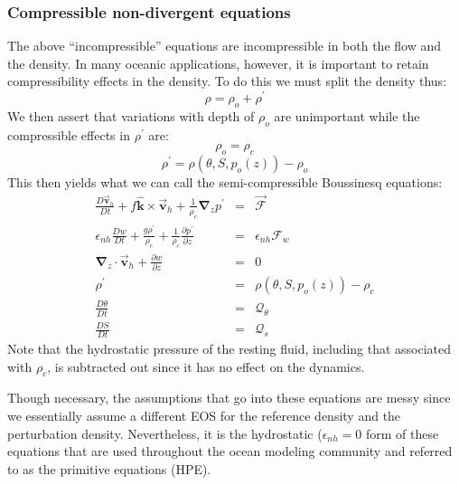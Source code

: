 \documentclass[12pt]{book}
\begin{document}
\subsubsection{Compressible non-divergent equations}

The above ``incompressible'' equations are incompressible in both the flow
and the density. In many oceanic applications, however, it is important to
retain compressibility effects in the density. To do this we must split the
density thus: 
\begin{equation*}
\rho =\rho _{o}+\rho ^{\prime }
\end{equation*}
We then assert that variations with depth of $\rho _{o}$ are unimportant
while the compressible effects in $\rho ^{\prime }$ are: 
\begin{equation*}
\rho _{o}=\rho _{c}
\end{equation*}
\begin{equation*}
\rho ^{\prime }=\rho (\theta ,S,p_{o}(z))-\rho _{o}
\end{equation*}
This then yields what we can call the semi-compressible Boussinesq
equations: 
\begin{eqnarray}
\frac{D\vec{\mathbf{v}}_{h}}{Dt}+f\hat{\mathbf{k}}\times \vec{\mathbf{v}}
_{h}+\frac{1}{\rho _{c}}\mathbf{\nabla }_{z}p^{\prime } &=&\vec{\mathbf{
\mathcal{F}}}  \label{eq:ocean-mom} \\
\epsilon _{nh}\frac{Dw}{Dt}+\frac{g\rho ^{\prime }}{\rho _{c}}+\frac{1}{\rho
_{c}}\frac{\partial p^{\prime }}{\partial z} &=&\epsilon _{nh}\mathcal{F}_{w}
\label{eq:ocean-wmom} \\
\mathbf{\nabla }_{z}\cdot \vec{\mathbf{v}}_{h}+\frac{\partial w}{\partial z}
&=&0  \label{eq:ocean-cont} \\
\rho ^{\prime } &=&\rho (\theta ,S,p_{o}(z))-\rho _{c}  \label{eq:ocean-eos}
\\
\frac{D\theta }{Dt} &=&\mathcal{Q}_{\theta }  \label{eq:ocean-theta} \\
\frac{DS}{Dt} &=&\mathcal{Q}_{s}  \label{eq:ocean-salt}
\end{eqnarray}
Note that the hydrostatic pressure of the resting fluid, including that
associated with $\rho _{c}$, is subtracted out since it has no effect on the
dynamics.

Though necessary, the assumptions that go into these equations are messy
since we essentially assume a different EOS for the reference density and
the perturbation density. Nevertheless, it is the hydrostatic ($\epsilon
_{nh}=0$ form of these equations that are used throughout the ocean modeling
community and referred to as the primitive equations (HPE).
\end{document}

